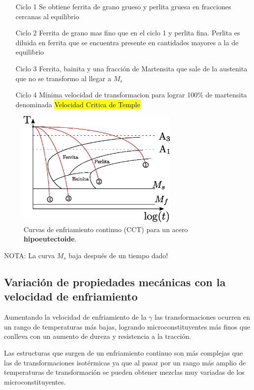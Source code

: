 \documentclass{article}
\begin{document}
\begin{itemize}
    \item[Ciclo 1] Se obtiene ferrita de grano grueso y perlita gruesa en fracciones cercanas al equilibrio
    \item[Ciclo 2] Ferrita de grano mas fino que en el ciclo 1 y perlita fina. Perlita es diluida en ferrita que se encuentra presente en cantidades mayores a la de equilibrio
    \item[Ciclo 3] Ferrita, bainita y una fracción de Martensita que sale de la austenita que no se transformo al llegar a $M_s$
    \item[Ciclo 4] Mínima velocidad de transformacion para lograr 100\% de martensita denominada \hl{Velocidad Critica de Temple}
\end{itemize}

\begin{figure}[htb!]
    \centering
    \includegraphics[width=0.7\textwidth]{fig/CCThipo.eps}
    \caption{Curvas de enfriamiento continuo (CCT) para un acero \textbf{hipoeutectoide}.}
    \label{fig:CCThipo}
\end{figure}

NOTA: La curva $M_s$ baja después de un tiempo dado!


\subsection{Variación de propiedades mecánicas con la velocidad de enfriamiento}
Aumentando la velocidad de enfriamiento de la $\gamma$ las transformaciones ocurren en un rango de temperaturas más bajas, logrando microconstituyentes más finos que conlleva con un aumento de dureza y resistencia a la tracción. 

Las estructuras que surgen de un enfriamiento continuo son más complejas que las de transformaciones isotérmicas ya que al pasar por un rango más amplio de temperaturas de transformación se pueden obtener mezclas muy variadas de los microconstituyentes.
\end{document}
